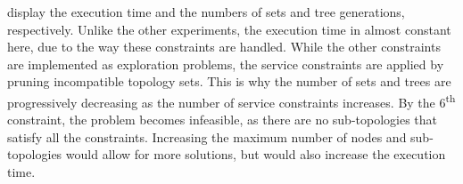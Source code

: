  display the execution time and the numbers of sets and tree generations, respectively.
Unlike the other experiments, the execution time in almost constant here, due to the way these constraints are handled.
While the other constraints are implemented as exploration problems, the service constraints are applied by pruning incompatible topology sets.
This is why the number of sets and trees are progressively decreasing as the number of service constraints increases.
By the 6\textsuperscript{th} constraint, the problem becomes infeasible, as there are no sub-topologies that satisfy all the constraints.
Increasing the maximum number of nodes and sub-topologies would allow for more solutions, but would also increase the execution time.